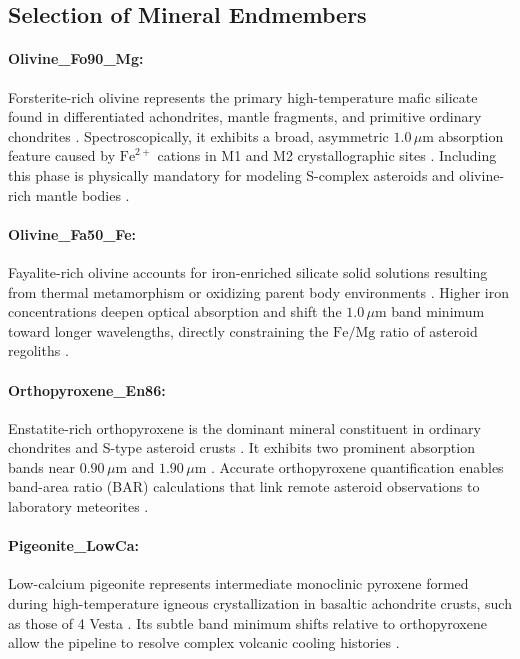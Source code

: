 \documentclass[11pt,a4paper]{article}
\begin{document}
\subsection{Selection of Mineral Endmembers}

\paragraph{Olivine\_Fo90\_Mg:} Forsterite-rich olivine represents the primary high-temperature mafic silicate found in differentiated achondrites, mantle fragments, and primitive ordinary chondrites \cite{Bostrom1987, Deer2013}. Spectroscopically, it exhibits a broad, asymmetric $1.0\,\mu\text{m}$ absorption feature caused by $\text{Fe}^{2+}$ cations in M1 and M2 crystallographic sites \cite{Burns1993, Cloutis1986}. Including this phase is physically mandatory for modeling S-complex asteroids and olivine-rich mantle bodies \cite{McCord1970, Gaffey1993}.

\paragraph{Olivine\_Fa50\_Fe:} Fayalite-rich olivine accounts for iron-enriched silicate solid solutions resulting from thermal metamorphism or oxidizing parent body environments \cite{Deer2013}. Higher iron concentrations deepen optical absorption and shift the $1.0\,\mu\text{m}$ band minimum toward longer wavelengths, directly constraining the $\text{Fe/Mg}$ ratio of asteroid regoliths \cite{Burns1993, Cloutis1986}.

\paragraph{Orthopyroxene\_En86:} Enstatite-rich orthopyroxene is the dominant mineral constituent in ordinary chondrites and S-type asteroid crusts \cite{Cameron1973, Bus2002}. It exhibits two prominent absorption bands near $0.90\,\mu\text{m}$ and $1.90\,\mu\text{m}$ \cite{Burns1993, Cloutis1986}. Accurate orthopyroxene quantification enables band-area ratio (BAR) calculations that link remote asteroid observations to laboratory meteorites \cite{Gaffey1993, Cloutis1986}.

\paragraph{Pigeonite\_LowCa:} Low-calcium pigeonite represents intermediate monoclinic pyroxene formed during high-temperature igneous crystallization in basaltic achondrite crusts, such as those of 4 Vesta \cite{Clark1969, Russell2012}. Its subtle band minimum shifts relative to orthopyroxene allow the pipeline to resolve complex volcanic cooling histories \cite{Burns1993, Cloutis1986}.
\end{document}
